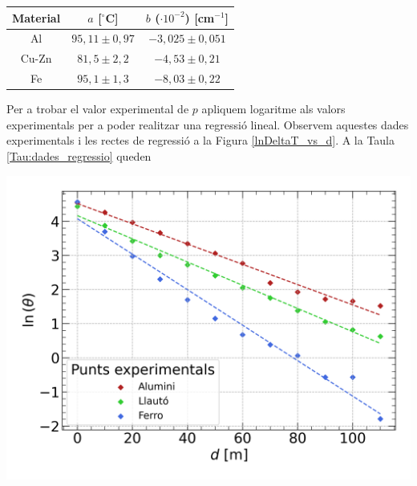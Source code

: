 \documentclass[12pt,twosides,onecolumn,openany]{article}
\newenvironment{Figura}
  {\par\medskip\noindent\minipage{\linewidth}}
  {\endminipage\par\medskip}
\begin{document}
\begin{multicols}{2}
\begin{Figura}
\end{Figura}

\begin{Figura}
  \centering
  \begin{tabular}{c|c|c}
    Material & $a$ [$^\circ$C] & $b$ ($\cdot 10^{-2}$) [cm$^{-1}$]\\
    \hline\hline
    Al & $95,11\pm0,97$ & $-3,025\pm0,051$\\
    Cu-Zn & $81,5\pm2,2$ & $-4,53\pm0,21$ \\
    Fe & $95,1\pm1,3$ & $-8,03\pm0,22$
  \end{tabular}
  \label{Tau:coef_exponencial}
\end{Figura}

Per a trobar el valor experimental de $p$ apliquem logaritme als valors experimentals per a poder realitzar una regressió lineal. Observem aquestes dades experimentals i les rectes de regressió a la Figura \ref{lnDeltaT_vs_d}. A la Taula \ref{Tau:dades_regressio} queden
\begin{Figura}
  \centering
  \includegraphics[width = 1\linewidth]{../../graphs/practica_Ia/plots/reg_estacionaria.png}\label{lnDeltaT_vs_d}
\end{Figura}           


\end{multicols}
\end{document}

